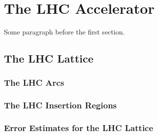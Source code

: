 
\chapter{The LHC Accelerator} %

\label{Chapter2} %


\newcommand{\keyword}[1]{\textbf{#1}}
\newcommand{\tabhead}[1]{\textbf{#1}}
\newcommand{\code}[1]{\texttt{#1}}
\newcommand{\file}[1]{\texttt{\bfseries#1}}
\newcommand{\option}[1]{\texttt{\itshape#1}}


Some paragraph before the first section.




\section{The LHC Lattice}


\subsection{The LHC Arcs}

\subsection{The LHC Insertion Regions}

\subsection{Error Estimates for the LHC Lattice}

